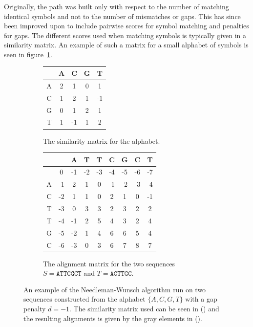 \documentclass[a4paper]{report}
\begin{document}
Originally, the path was built only with respect to the number of matching
identical symbols and not to the number of mismatches or gaps. This has since
been improved upon to include pairwise scores for symbol matching and penalties
for gaps. The different scores used when matching symbols is typically given in
a similarity matrix. An example of such a matrix for a small alphabet of
symbols is seen in figure~\ref{fig:simmatrix}.

\begin{figure}[t]
    \centering
    \begin{subfigure}[b]{0.3\textwidth}
        \begin{tabular}{| c | c | c | c | c |}
            \hline
              &  A &  C & G &  T \\ \hline
            A &  2 &  1 & 0 &  1 \\ \hline
            C &  1 &  2 & 1 & -1 \\ \hline
            G &  0 &  1 & 2 &  1 \\ \hline
            T &  1 & -1 & 1 &  2 \\ \hline
        \end{tabular}
        \caption{The similarity matrix for the alphabet.}
        \label{fig:simmatrix}
    \end{subfigure}
    \quad
    \begin{subfigure}[b]{0.55\textwidth}
        \begin{tabular}{| c | c | c | c | c | c | c | c | c |}
            \hline
            & & A & T & T & C & G & C & T \\ \hline
            &\cellcolor[gray]{0.9}0 & -1 & -2 & -3 & -4 & -5 & -6 & -7 \\
            \hline
            A & -1 &\cellcolor[gray]{0.9}2 & 1 & 0 & -1 & -2 & -3 & -4 \\
            \hline
            C & -2 &\cellcolor[gray]{0.9}1 & 1 & 0 & 2 & 1 & 0 & -1 \\ \hline
            T & -3 & 0 &\cellcolor[gray]{0.9}3 & 3 & 2 & 3 & 2 & 2 \\ \hline
            T & -4 & -1 & 2 &\cellcolor[gray]{0.9}5 &\cellcolor[gray]{0.9}4 & 3
            & 2 & 4 \\ \hline
            G & -5 & -2 & 1 & 4 & 6 &\cellcolor[gray]{0.9}6 & 5 & 4 \\ \hline
            C & -6 & -3 & 0 & 3 & 6 & 7 &\cellcolor[gray]{0.9}8 &
            \cellcolor[gray]{0.9}7 \\ \hline
        \end{tabular}
        \caption{The alignment matrix for the two sequences
            $S = \texttt{ATTCGCT}$ and $T = \texttt{ACTTGC}$.}
        \label{fig:nwmatrix}
    \end{subfigure}
    \caption{An example of the Needleman-Wunsch algorithm run on two sequences
    constructed from the alphabet $\{A, C, G, T\}$ with a gap penalty $d = -1$.
    The similarity matrix used can be seen in () and the
    resulting alignments is given by the gray elements in
    ().}
    \label{fig:nwtables}
\end{figure}
\end{document}
